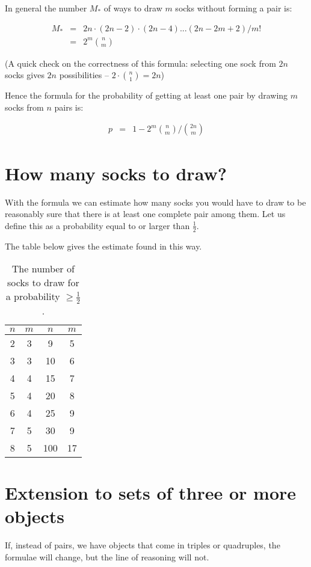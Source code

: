 \documentclass[onecolumn]{article}
\begin{document}
In general the number $M_*$ of ways to draw $m$ socks without forming a pair is:

\begin{eqnarray}
\nonumber M_* &=& 2n \cdot (2n-2) \cdot (2n-4) ... (2n-2m+2) / m! \\
            &=& 2^m \binom{n}{m}
\end{eqnarray}

(A quick check on the correctness of this formula: selecting one sock from $2n$ socks
gives $2n$ possibilities -- $2 \cdot \binom{n}{1} = 2n$)

Hence the formula for the probability of getting at least one pair by drawing
$m$ socks from $n$ pairs is:

\begin{eqnarray}
\nonumber p &=& 1 - 2^m \binom{n}{m} \bigg/ \binom{2n}{m}
\end{eqnarray}


\section*{How many socks to draw?}
With the formula we can estimate how many socks you would have to draw
to be reasonably sure that there is at least one complete pair among them.
Let us define this as a probability equal to or larger than $\frac{1}{2}$.

The table below gives the estimate found in this way.

\begin{table}[h!]
\caption{The number of socks to draw for a probability $\geq \frac{1}{2}$.}
\center
\begin{tabular}{cc|cc}
  $n$       &   $m$   &    $n$       &  $m$   \\
\hline
   2        &    3    &     9        &    5   \\
   3        &    3    &     10       &    6   \\
   4        &    4    &     15       &    7   \\
   5        &    4    &     20       &    8   \\
   6        &    4    &     25       &    9   \\
   7        &    5    &     30       &    9   \\
   8        &    5    &    100       &   17   \\
\end{tabular}
\end{table}


\section*{Extension to sets of three or more objects}
If, instead of pairs, we have objects that come in triples or quadruples, the
formulae will change, but the line of reasoning will not.
\end{document}
